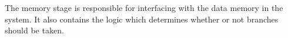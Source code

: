 The memory stage is responsible for interfacing with the data memory in the system.
It also contains the logic which determines whether or not branches should be taken.
